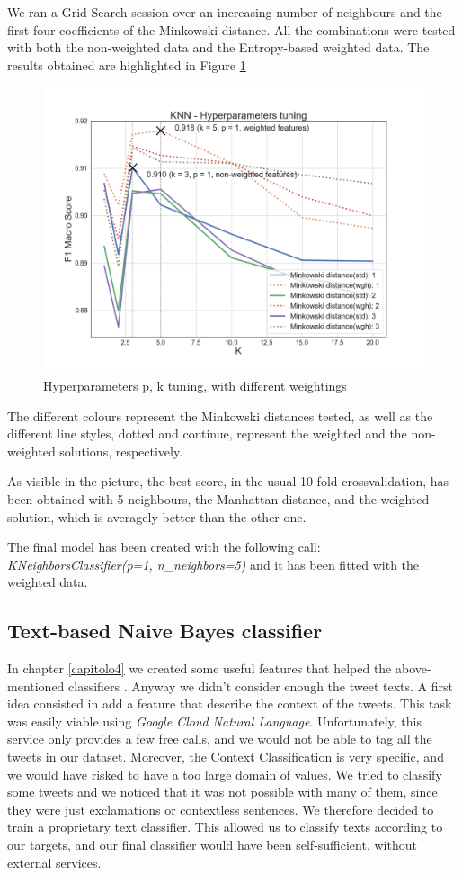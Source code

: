 We ran a Grid Search session over an increasing number of neighbours and the first four coefficients of the Minkowski distance.
All the combinations were tested with both the non-weighted data and the Entropy-based weighted data.
The results obtained are highlighted in Figure \ref{fig:knn_tuning}

\begin{figure}
	\includegraphics[width=\columnwidth]{chapter5/figure/knn_tuning.png}
	\caption{Hyperparameters p, k tuning, with different weightings}
	\label{fig:knn_tuning}
\end{figure}
The different colours represent the Minkowski distances tested, as well as the different line styles, dotted and continue, represent the weighted and the non-weighted solutions, respectively.

As visible in the picture, the best score, in the usual 10-fold crossvalidation, has been obtained with 5 neighbours, the Manhattan distance, and the weighted solution, which is averagely better than the other one.

The final model has been created with the following call: \textit{KNeighborsClassifier(p=1, n\_neighbors=5)} and it has been fitted with the weighted data.

\subsection{Text-based Naive Bayes classifier}
In chapter \ref{capitolo4} we created some useful features that helped the above-mentioned classifiers . Anyway we didn't consider enough the tweet texts. A first idea consisted in add a feature that describe the context of the tweets. This task was easily viable using \textit{Google Cloud Natural Language}. Unfortunately, this service only provides a few free calls, and we would not be able to tag all the tweets in our dataset. Moreover, the Context Classification is very specific, and we would have risked to have a too large domain of values. We tried to classify some tweets and we noticed that it was not possible with many of them, since they were just exclamations or contextless sentences. We therefore decided to train a proprietary text classifier. This allowed us to classify texts according to our targets, and our final classifier would have been self-sufficient, without external services.

